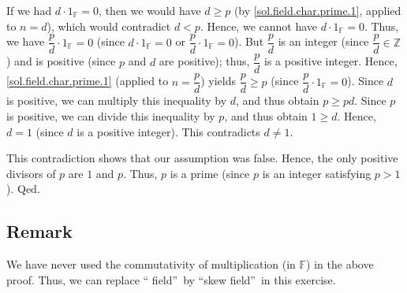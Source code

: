 \documentclass[paper=a4, fontsize=12pt]{scrartcl}%
\theoremstyle{plainsl}
\theoremstyle{definition}
\theoremstyle{remark}
\begin{document}
If we had $d\cdot1_{\mathbb{F}}=0$, then we would have $d\geq p$ (by
\eqref{sol.field.char.prime.1}, applied to $n=d$), which would contradict
$d<p$. Hence, we cannot have $d\cdot1_{\mathbb{F}}=0$. Thus, we have
$\dfrac{p}{d}\cdot1_{\mathbb{F}}=0$ (since $d\cdot1_{\mathbb{F}}=0$ or
$\dfrac{p}{d}\cdot1_{\mathbb{F}}=0$). But $\dfrac{p}{d}$ is an integer (since
$\dfrac{p}{d}\in\mathbb{Z}$) and is positive (since $p$ and $d$ are positive);
thus, $\dfrac{p}{d}$ is a positive integer. Hence,
\eqref{sol.field.char.prime.1} (applied to $n=\dfrac{p}{d}$) yields $\dfrac
{p}{d}\geq p$ (since $\dfrac{p}{d}\cdot1_{\mathbb{F}}=0$). Since $d$ is
positive, we can multiply this inequality by $d$, and thus obtain $p\geq pd$.
Since $p$ is positive, we can divide this inequality by $p$, and thus obtain
$1\geq d$. Hence, $d=1$ (since $d$ is a positive integer). This contradicts
$d\neq1$.

This contradiction shows that our assumption was false. Hence, the only
positive divisors of $p$ are $1$ and $p$. Thus, $p$ is a prime (since $p$ is
an integer satisfying $p>1$). Qed.

\subsection{Remark}

We have never used the commutativity of multiplication (in $\mathbb{F}$) in
the above proof. Thus, we can replace \textquotedblleft
field\textquotedblright\ by \textquotedblleft skew field\textquotedblright\ in
this exercise.
\end{document}
